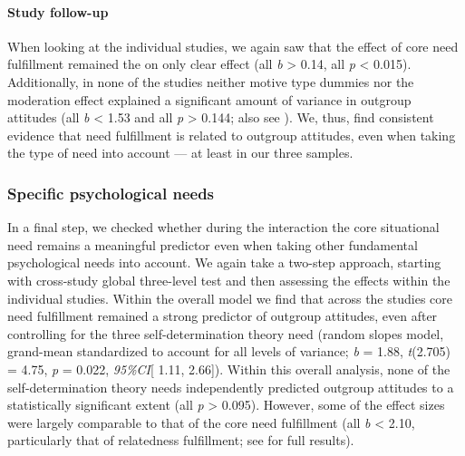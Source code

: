 \paragraph{Study follow-up}

When looking at the individual studies, we again saw that the effect of
core need fulfillment remained the on only clear effect (all
\textbar{}\textit{b}\textbar{} \textgreater{} 0.14, all \textit{p}
\textless{} 0.015). Additionally, in none of the studies neither motive
type dummies nor the moderation effect explained a significant amount of
variance in outgroup attitudes (all \textbar{}\textit{b}\textbar{}
\textless{} 1.53 and all \textit{p} \textgreater{} 0.144; also see
). We, thus, find consistent evidence that
need fulfillment is related to outgroup attitudes, even when taking the
type of need into account --- at least in our three samples.

\subsubsection{Specific psychological needs}

In a final step, we checked whether during the interaction the core
situational need remains a meaningful predictor even when taking other
fundamental psychological needs into account. We again take a two-step
approach, starting with cross-study global three-level test and then
assessing the effects within the individual studies. Within the overall
model we find that across the studies core need fulfillment remained a
strong predictor of outgroup attitudes, even after controlling for the
three self-determination theory need (random slopes model, grand-mean
standardized to account for all levels of variance; \textit{b} = 1.88,
\textit{t}(2.705) = 4.75, \textit{p} = 0.022, \textit{95\%CI}{[} 1.11,
2.66{]}). Within this overall analysis, none of the self-determination
theory needs independently predicted outgroup attitudes to a
statistically significant extent (all \textit{p} \textgreater{} 0.095).
However, some of the effect sizes were largely comparable to that of the
core need fulfillment (all \textbar{}\textit{b}\textbar{} \textless{}
2.10, particularly that of relatedness fulfillment; see
 for full results).

